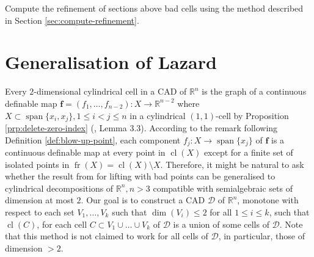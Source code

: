 \documentclass[
]{book}
\theoremstyle{definition}
\theoremstyle{definition}
\theoremstyle{definition}
\theoremstyle{definition}
\theoremstyle{remark}
\begin{document}
Compute the refinement of sections above bad cells using the method described in Section \ref{sec:compute-refinement}.

\hypertarget{sec:lazard-n}{%
\section{Generalisation of Lazard}\label{sec:lazard-n}}

Every \(2\)-dimensional cylindrical cell in a CAD of \(\mathbb{R}^n\) is the graph of a continuous definable map \(\mathbf{f} = (f_1,\ldots,f_{n-2}) : X \to \mathbb{R}^{n-2}\) where \(X \subset {\operatorname{span} \{x_i,x_j\}}, 1 \le i < j \le n\) in a cylindrical
\((1,1)\)-cell by Proposition \ref{prp:delete-zero-index} (\citet{bgv13}, Lemma 3.3). According to the remark following
Definition \ref{def:blow-up-point}, each component \(f_j : X \to {\operatorname{span} \{x_j\}}\) of \(\mathbf{f}\) is a continuous definable map at every point in \({\operatorname{cl} \left( X \right)}\) except for a finite set of isolated points in \({\operatorname{fr} \left( X \right)} = {\operatorname{cl} \left( X \right)} \setminus X\).
Therefore, it might be natural to ask whether the result from \citet{lazard10} for lifting with bad points can be generalised to cylindrical decompositions of \(\mathbb{R}^n, n > 3\) compatible with semialgebraic sets of dimension at most \(2\).
Our goal is to construct a CAD \(\mathcal{D}\) of \(\mathbb{R}^n\), monotone with respect to each set \(V_1, \ldots, V_k\) such that \(\dim(V_i) \le 2\) for all \(1 \le i \le k\), such that \({\operatorname{cl} \left( C \right)}\), for each cell \(C \subset V_1 \cup \ldots \cup V_k\) of \(\mathcal{D}\) is a union of some cells of \(\mathcal{D}\).
Note that this method is not claimed to work for all cells of \(\mathcal{D}\), in particular, those of dimension \(> 2\).
\end{document}
